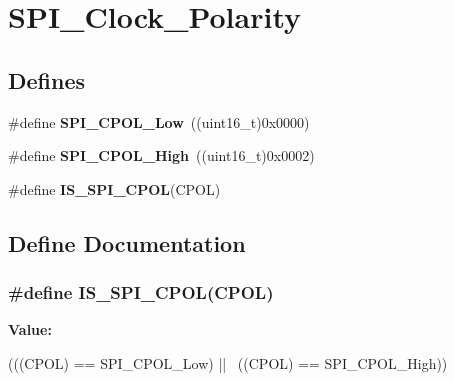 \hypertarget{group__SPI__Clock__Polarity}{
\section{SPI\_\-Clock\_\-Polarity}
\label{group__SPI__Clock__Polarity}
}
\subsection*{Defines}
\begin{DoxyCompactItemize}
\item 
\hypertarget{group__SPI__Clock__Polarity_ga3dbc0234c4b4e7c37137e7c189f3c085}{
\#define {\bfseries SPI\_\-CPOL\_\-Low}~((uint16\_\-t)0x0000)}
\label{group__SPI__Clock__Polarity_ga3dbc0234c4b4e7c37137e7c189f3c085}

\item 
\hypertarget{group__SPI__Clock__Polarity_ga4431f2edf42f8298d5bbe693351edbb0}{
\#define {\bfseries SPI\_\-CPOL\_\-High}~((uint16\_\-t)0x0002)}
\label{group__SPI__Clock__Polarity_ga4431f2edf42f8298d5bbe693351edbb0}

\item 
\#define {\bfseries IS\_\-SPI\_\-CPOL}(CPOL)
\end{DoxyCompactItemize}


\subsection{Define Documentation}
\hypertarget{group__SPI__Clock__Polarity_gafc1cc5b1ff7e801a409a7a1e6047acf9}{
\subsubsection[{IS\_\-SPI\_\-CPOL}]{\setlength{\rightskip}{0pt plus 5cm}\#define IS\_\-SPI\_\-CPOL(CPOL)}}
\label{group__SPI__Clock__Polarity_gafc1cc5b1ff7e801a409a7a1e6047acf9}
{\bfseries Value:}
\begin{DoxyCode}
(((CPOL) == SPI_CPOL_Low) || \
                           ((CPOL) == SPI_CPOL_High))
\end{DoxyCode}
